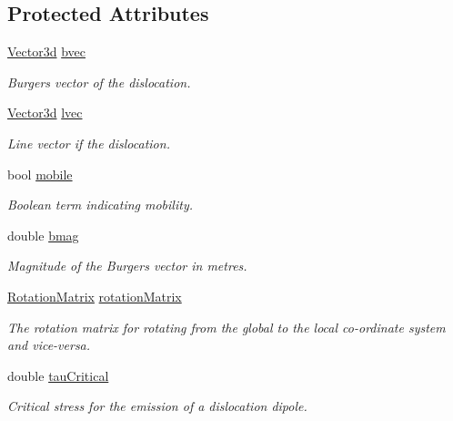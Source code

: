 \subsection*{\-Protected \-Attributes}
\begin{DoxyCompactItemize}
\item 
\hyperlink{classVector3d}{\-Vector3d} \hyperlink{classDislocationSource_ade4753ac6106317c693c2bba4f83a568}{bvec}
\begin{DoxyCompactList}\small\item\em \-Burgers vector of the dislocation. \end{DoxyCompactList}\item 
\hyperlink{classVector3d}{\-Vector3d} \hyperlink{classDislocationSource_a6a1ab6dc549236d2335a200e601781ea}{lvec}
\begin{DoxyCompactList}\small\item\em \-Line vector if the dislocation. \end{DoxyCompactList}\item 
bool \hyperlink{classDislocationSource_a7cfb4fd64ac4da8c79398b6e2c732875}{mobile}
\begin{DoxyCompactList}\small\item\em \-Boolean term indicating mobility. \end{DoxyCompactList}\item 
double \hyperlink{classDislocationSource_a59c95f3cb5af5180d2c42792413f7816}{bmag}
\begin{DoxyCompactList}\small\item\em \-Magnitude of the \-Burgers vector in metres. \end{DoxyCompactList}\item 
\hyperlink{classRotationMatrix}{\-Rotation\-Matrix} \hyperlink{classDislocationSource_a3bb826a0646d5c5546045cbf8d523b4f}{rotation\-Matrix}
\begin{DoxyCompactList}\small\item\em \-The rotation matrix for rotating from the global to the local co-\/ordinate system and vice-\/versa. \end{DoxyCompactList}\item 
double \hyperlink{classDislocationSource_ad91294a3ab5b6f6156a2ad67b9df954e}{tau\-Critical}
\begin{DoxyCompactList}\small\item\em \-Critical stress for the emission of a dislocation dipole. \end{DoxyCompactList}\item 

\end{DoxyCompactItemize}
